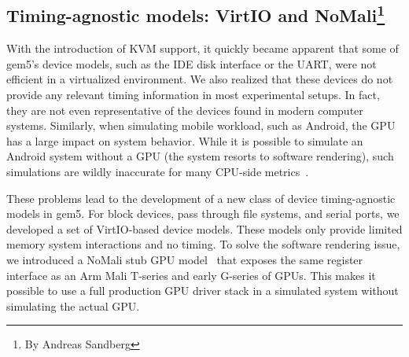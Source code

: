 \subsection[Timing-agnostic models: VirtIO and NoMali]{Timing-agnostic models: VirtIO and NoMali\footnote{By Andreas Sandberg}}

With the introduction of KVM support, it quickly became apparent that some of gem5’s device models, such as the IDE disk interface or the UART, were not efficient in a virtualized environment.
We also realized that these devices do not provide any relevant timing information in most experimental setups.
In fact, they are not even representative of the devices found in modern computer systems.
Similarly, when simulating mobile workload, such as Android, the GPU has a large impact on system behavior.
While it is possible to simulate an Android system without a GPU (the system resorts to software rendering), such simulations are wildly inaccurate for many CPU-side metrics~\cite{nomali}.

These problems lead to the development of a new class of device timing-agnostic models in gem5.
For block devices, pass through file systems, and serial ports, we developed a set of VirtIO-based device models.
These models only provide limited memory system interactions and no timing. To solve the software rendering issue, we introduced a NoMali stub GPU model~\cite{nomali} that exposes the same register interface as an Arm Mali T-series and early G-series of GPUs.
This makes it possible to use a full production GPU driver stack in a simulated system without simulating the actual GPU.

